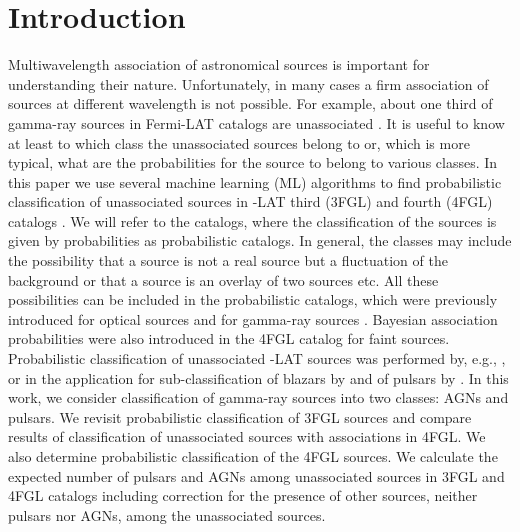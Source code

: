 \section{Introduction}

Multiwavelength association of astronomical sources is important for understanding their nature.
Unfortunately, in many cases a firm association of sources at different wavelength is not possible.
For example, about one third of gamma-ray sources in Fermi-LAT catalogs are unassociated
\citep{2010ApJS..188..405A, 2012ApJS..199...31N, 2015ApJS..218...23A, 2020ApJS..247...33A}.
It is useful to know at least to which class the unassociated sources belong to or, which is more typical,
what are the probabilities for the source to belong to various classes.
In this paper we use several machine learning (ML) algorithms to find probabilistic classification of
unassociated sources in \Fermi-LAT third (3FGL) and fourth (4FGL) catalogs \citep{2015ApJS..218...23A, 2020ApJS..247...33A}.
We will refer to the catalogs, where the classification of the sources is given by probabilities as probabilistic catalogs.
In general, the classes may include the possibility that a source is not a real source but a fluctuation of the background 
or that a source is an overlay of two sources etc.
All these possibilities can be included in the probabilistic catalogs, which were previously introduced for optical sources 
\citep[e.g.,][]{2010EAS....45..351H, 2013AJ....146....7B}
and for gamma-ray sources \citep{2017ApJ...839....4D}.
Bayesian association probabilities were also introduced in the 4FGL catalog \citep{2020ApJS..247...33A} for faint sources.
Probabilistic classification of unassociated \Fermi-LAT sources was performed by, e.g.,
\cite{2012ApJ...753...83A, 2016ApJ...820....8S, 2016ApJ...825...69M, 2017A&A...602A..86L, 2020MNRAS.492.5377L, 2020arXiv200106010Z},
or in the application for sub-classification of blazars by
\cite{2013MNRAS.428..220H, 2014ApJ...782...41D, 2016MNRAS.462.3180C, 2017MNRAS.470.1291S, 2019MNRAS.490.4770K, 2020MNRAS.493.1926K}
and of pulsars by \cite{2012MNRAS.424.2832L, 2016ApJ...820....8S}.
In this work, we consider classification of gamma-ray sources into two classes: AGNs and pulsars.
We revisit probabilistic classification of 3FGL sources and compare results of classification of unassociated sources
with associations in 4FGL.
We also determine probabilistic classification of the 4FGL sources.
We calculate the expected number of pulsars and AGNs among unassociated sources in 3FGL and 4FGL catalogs
including correction for the presence of other sources, neither pulsars nor AGNs, among the unassociated sources.


